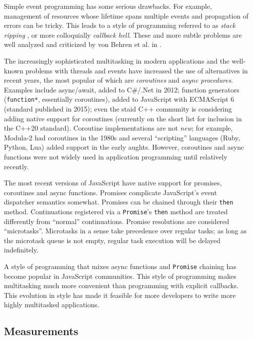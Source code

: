 \documentclass[acmsmall,anonymous,review]{acmart}\settopmatter{printfolios=true,printccs=false,printacmref=false}
\begin{document}
Simple event programming has some serious drawbacks.
For example, management of resources whose lifetime spans multiple events and propagation of errors can be tricky.
This leads to a style of programming referred to as \emph{stack ripping} \cite{Adya2002}, or more colloquially \emph{callback hell}.
These and more subtle problems are well analyzed and criticized by von Behren et al. in \cite{Behren2003a}.

The increasingly sophisticated multitasking in modern applications and the well-known problems with threads and events have increased the use of alternatives in recent years, the most popular of which are \emph{coroutines} and \emph{async procedures}.
Examples include async/await, added to C\#/.Net in 2012; function generators (\texttt{function*}, essentially coroutines), added to JavaScript with ECMAScript 6 (standard published in 2015); even the staid C++ community is considering adding native support for coroutines (currently on the short list for inclusion in the C++20 standard).
Coroutine implementations are not \emph{new}; for example, Modula-2 had coroutines in the 1980s and several ``scripting'' languages (Ruby, Python, Lua) added support in the early aughts.
However, coroutines and async functions were not widely used in application programming until relatively recently.

The most recent versions of JavaScript have native support for promises, coroutines and async functions.
Promises complicate JavaScript's event dispatcher semantics somewhat.
Promises can be chained through their \texttt{then} method.
Continuations registered via a \texttt{Promise}'s \texttt{then} method are treated differently from ``normal'' continuations.
Promise resolutions are considered ``microtasks''.
Microtasks in a sense take precedence over regular tasks; as long as the microtask queue is not empty, regular task execution will be delayed indefinitely.

A style of programming that mixes async functions and \texttt{Promise} chaining has become popular in JavaScript communities.
This style of programming makes multitasking much more convenient than programming with explicit callbacks.
This evolution in style has made it feasible for more developers to write more highly multitasked applications.

\subsection{Measurements}
\end{document}
